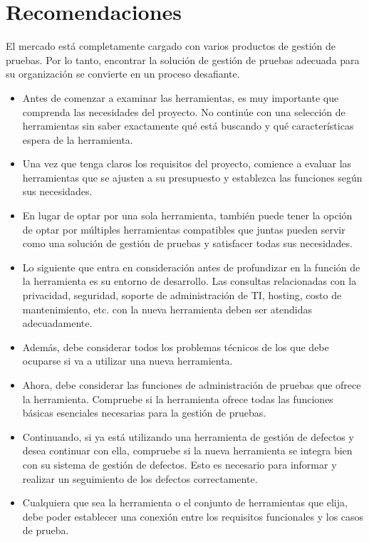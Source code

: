 \documentclass[twoside,twocolumn]{article}
\begin{document}
\section{Recomendaciones}
El mercado está completamente cargado con varios productos de gestión de pruebas. Por lo tanto, encontrar la solución de gestión de pruebas adecuada para su organización se convierte en un proceso desafiante. 
\begin{itemize}
    \item 	Antes de comenzar a examinar las herramientas, es muy importante que comprenda las necesidades del proyecto. No continúe con una selección de herramientas sin saber exactamente qué está buscando y qué características espera de la herramienta. 
    \item 	Una vez que tenga claros los requisitos del proyecto, comience a evaluar las herramientas que se ajusten a su presupuesto y establezca las funciones según sus necesidades. 
    \item 	En lugar de optar por una sola herramienta, también puede tener la opción de optar por múltiples herramientas compatibles que juntas pueden servir como una solución de gestión de pruebas y satisfacer todas sus necesidades. 
    \item 	Lo siguiente que entra en consideración antes de profundizar en la función de la herramienta es su entorno de desarrollo. Las consultas relacionadas con la privacidad, seguridad, soporte de administración de TI, hosting, costo de mantenimiento, etc. con la nueva herramienta deben ser atendidas adecuadamente. 
    \item 	Además, debe considerar todos los problemas técnicos de los que debe ocuparse si va a utilizar una nueva herramienta. 
    \item 	Ahora, debe considerar las funciones de administración de pruebas que ofrece la herramienta. Compruebe si la herramienta ofrece todas las funciones básicas esenciales necesarias para la gestión de pruebas. 
  \item 	Continuando, si ya está utilizando una herramienta de gestión de defectos y desea continuar con ella, compruebe si la nueva herramienta se integra bien con su sistema de gestión de defectos. Esto es necesario para informar y realizar un seguimiento de los defectos correctamente. 
    \item 	Cualquiera que sea la herramienta o el conjunto de herramientas que elija, debe poder establecer una conexión entre los requisitos funcionales y los casos de prueba.  
\end{itemize}
\end{document}
